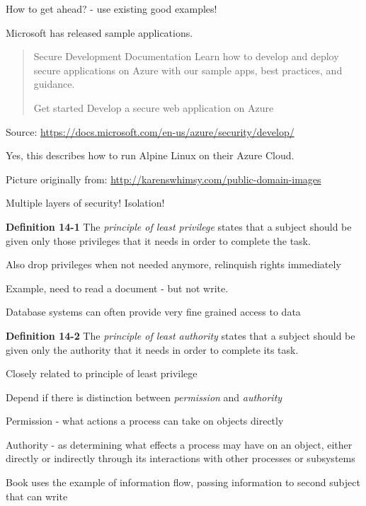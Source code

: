 \documentclass[Screen16to9,17pt]{foils}
\begin{document}

How to get ahead? - use existing good examples!

Microsoft has released sample applications.

\begin{quote}
Secure Development Documentation
Learn how to develop and deploy secure applications on Azure with our sample apps, best practices, and guidance.

Get started
Develop a secure web application on Azure
\end{quote}

Source:
\url{https://docs.microsoft.com/en-us/azure/security/develop/}

Yes, this describes how to run Alpine Linux on their Azure Cloud.



\centerline{Picture originally from: \url{http://karenswhimsy.com/public-domain-images}}




\centerline{\hlkbig\color{security6blue} Multiple layers of security! Isolation!}




\begin{list1}
\item {\bf Definition 14-1} The \emph{principle of least privilege} states that a subject should be given only those privileges that it needs in order to complete the task.
\item Also drop privileges when not needed anymore, relinquish rights immediately
\item Example, need to read a document - but not write.
\item Database systems can often provide very fine grained access to data
\end{list1}



\begin{list1}
\item
\item {\bf Definition 14-2} The \emph{principle of least authority} states that a subject should be given only the authority that it needs in order to complete its task.
\item Closely related to principle of least privilege
\item Depend if there is distinction between \emph{permission} and \emph{authority}
\item Permission - what actions a process can take on objects directly
\item Authority - as determining what effects a process may have on an object, either directly or indirectly through its interactions with other processes or subsystems
\item Book uses the example of information flow, passing information to second subject that can write
\end{list1}
\end{document}
